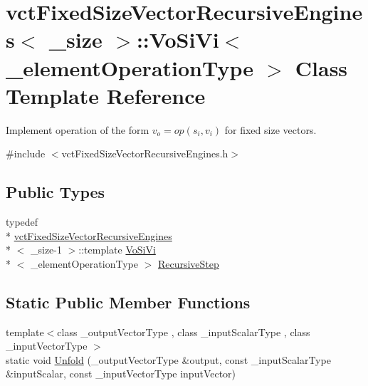 \hypertarget{classvct_fixed_size_vector_recursive_engines_1_1_vo_si_vi}{\section{vct\-Fixed\-Size\-Vector\-Recursive\-Engines$<$ \-\_\-size $>$\-:\-:Vo\-Si\-Vi$<$ \-\_\-element\-Operation\-Type $>$ Class Template Reference}
\label{classvct_fixed_size_vector_recursive_engines_1_1_vo_si_vi}
}


Implement operation of the form $v_o = op(s_i, v_i)$ for fixed size vectors.  




{\ttfamily \#include $<$vct\-Fixed\-Size\-Vector\-Recursive\-Engines.\-h$>$}

\subsection*{Public Types}
\begin{DoxyCompactItemize}
\item 
typedef \\*
\hyperlink{classvct_fixed_size_vector_recursive_engines}{vct\-Fixed\-Size\-Vector\-Recursive\-Engines}\\*
$<$ \-\_\-size-\/1 $>$\-::template \hyperlink{classvct_fixed_size_vector_recursive_engines_1_1_vo_si_vi}{Vo\-Si\-Vi}\\*
$<$ \-\_\-element\-Operation\-Type $>$ \hyperlink{classvct_fixed_size_vector_recursive_engines_1_1_vo_si_vi_a2a5c575fa0857d0d6c13610f43c9302d}{Recursive\-Step}
\end{DoxyCompactItemize}
\subsection*{Static Public Member Functions}
\begin{DoxyCompactItemize}
\item 
{\footnotesize template$<$class \-\_\-output\-Vector\-Type , class \-\_\-input\-Scalar\-Type , class \-\_\-input\-Vector\-Type $>$ }\\static void \hyperlink{classvct_fixed_size_vector_recursive_engines_1_1_vo_si_vi_aecc1ea87eb108820d8778ce739c94df2}{Unfold} (\-\_\-output\-Vector\-Type \&output, const \-\_\-input\-Scalar\-Type \&input\-Scalar, const \-\_\-input\-Vector\-Type input\-Vector)
\end{DoxyCompactItemize}


